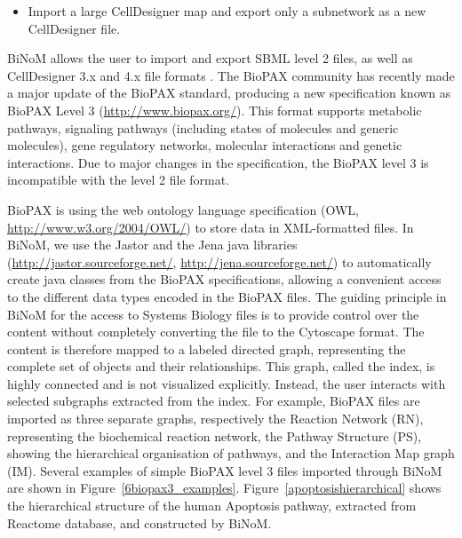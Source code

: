 \documentclass[10pt]{bmc_article}
\newenvironment{bmcformat}{\baselineskip20pt\sloppy\setboolean{publ}{false}}{\baselineskip20pt\sloppy}
\begin{document}
\begin{bmcformat}
\begin{itemize}
\item Import a large CellDesigner map and export only a subnetwork as a new CellDesigner file.

\end{itemize}

BiNoM allows the user to import and export SBML level 2 files, as well as
CellDesigner 3.x and 4.x file formats \cite{zinovyev2008binom}. The BioPAX
community has recently made a major update of the BioPAX standard, producing a
new specification known as BioPAX Level 3 (\url{http://www.biopax.org/}). This
format supports metabolic pathways, signaling pathways (including states of molecules
and generic molecules), gene regulatory networks, molecular interactions and
genetic interactions. Due to major changes in the
specification, the BioPAX level 3 is incompatible with the level 2 file format.

BioPAX is using the web ontology language specification (OWL,
\url{http://www.w3.org/2004/OWL/}) to store data in XML-formatted files. In
BiNoM, we use the Jastor and the Jena java libraries
(\url{http://jastor.sourceforge.net/}, \url{http://jena.sourceforge.net/}) to
automatically create java classes from the BioPAX specifications, allowing a
convenient access to the different data types encoded in the BioPAX files. The
guiding principle in BiNoM for the
access to Systems Biology files is to provide control over the content without
completely converting the file to the Cytoscape format. The content is therefore
mapped to a labeled directed graph, representing the complete set of objects and
their relationships. This graph, called the index, is highly connected and is
not visualized explicitly. Instead, the user interacts with selected subgraphs
extracted from the index. For example, BioPAX files are imported as three
separate graphs, respectively the Reaction Network (RN), representing the
biochemical reaction network, the Pathway Structure (PS), showing the
hierarchical organisation of pathways, and the Interaction Map graph
(IM). Several examples of simple BioPAX level 3 files imported through BiNoM
are shown in Figure~\ref{6biopax3_examples}. Figure~\ref{apoptosishierarchical}
shows the hierarchical structure of the human Apoptosis pathway, extracted
from Reactome database, and constructed by BiNoM.



\end{bmcformat}
\end{document}
